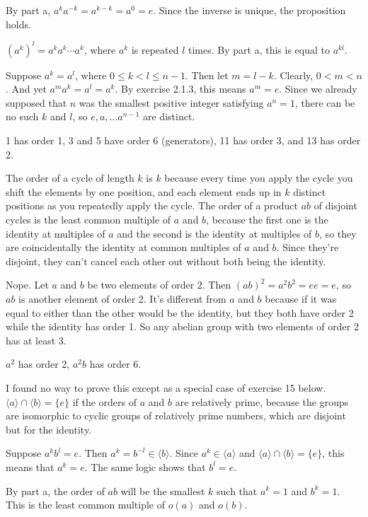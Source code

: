 \documentclass[11pt, oneside]{article}   	%
\begin{document}
\item By part a, $a^ka^{-k} = a^{k-k} = a^0 = e$. Since the inverse is unique, the proposition holds.
\item $(a^k)^l = a^ka^k\cdots a^k$, where $a^k$ is repeated $l$ times. By part a, this is equal to $a^{kl}$.
\ee
\item Suppose $a^k = a^l$, where $0 \le k < l \le n-1$. Then let $m = l - k$. Clearly, $0 < m < n$. And yet $a^ma^k = a^l = a^k$. By exercise 2.1.3, this means $a^m = e$. Since we already supposed that $n$ was the smallest positive integer satisfying $a^n = 1$, there can be no such $k$ and $l$, so $e, a, \ldots a^{n-1}$ are distinct.
\item 1 has order 1, 3 and 5 have order 6 (generators), 11 has order 3, and 13 has order 2.
\item  The order of a cycle of length $k$ is $k$ because every time you apply the cycle you shift the elements by one position, and each element ends up in $k$ distinct positions as you repeatedly apply the cycle. The order of a product $ab$ of disjoint cycles is the least common multiple of $a$ and $b$, because the first one is the identity at multiples of $a$ and the second is the identity at multiples of $b$, so they are coincidentally the identity at common multiples of $a$ and $b$. Since they're disjoint, they can't cancel each other out without both being the identity.
\item Nope. Let $a$ and $b$ be two elements of order 2. Then $(ab)^2 = a^2b^2 = ee = e$, so $ab$ is another element of order 2. It's different from $a$ and $b$ because if it was equal to either than the other would be the identity, but they both have order 2 while the identity has order 1. So any abelian group with two elements of order 2 has at least 3.
\item $a^2$ has order 2, $a^2b$ has order 6.
\item I found no way to prove this except as a special case of exercise 15 below. $\langle a \rangle \cap \langle b \rangle = \{e\}$ if the orders of $a$ and $b$ are relatively prime, because the groups are isomorphic to cyclic groups of relatively prime numbers, which are disjoint but for the identity.
\item \be
\item Suppose $a^kb^l = e$. Then $a^k = b^{-l} \in \langle b \rangle.$ Since $a^k \in \langle a \rangle$ and $\langle a \rangle \cap \langle b \rangle = \{e\}$, this means that $a^k = e$. The same logic shows that $b^l = e$. 
\item By part a, the order of $ab$ will be the smallest $k$ such that $a^k = 1$ and $b^k = 1$. This is the least common multiple of $o(a)$ and $o(b)$. 
\end{document}
